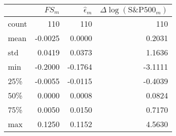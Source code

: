 \begin{tabular}{lrrr}
\toprule
{} &  \(FS_m\) &  \(\hat{\epsilon}_m\) &  \(\Delta \log{(\text{S\&P500}_m)}\) \\
\midrule
count &  110 &              110 &                             110 \\
mean  &   -0.0025 &                0.0000 &                               0.2031 \\
std   &    0.0419 &                0.0373 &                               1.1636 \\
min   &   -0.2000 &               -0.1764 &                              -3.1111 \\
25\%   &   -0.0055 &               -0.0115 &                              -0.4039 \\
50\%   &    0.0000 &                0.0008 &                               0.0824 \\
75\%   &    0.0050 &                0.0150 &                               0.7170 \\
max   &    0.1250 &                0.1152 &                               4.5630 \\
\bottomrule
\end{tabular}
